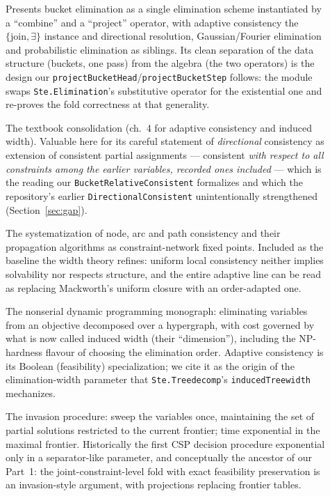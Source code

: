 \documentclass[11pt]{article}
\newcommand{\ste}[1]{\texttt{#1}}
\begin{document}
\begin{description}
\item[\citet{dechter1999bucket}] Presents bucket elimination as a
single elimination scheme instantiated by a ``combine'' and a
``project'' operator, with adaptive consistency the
$\{\text{join},\exists\}$ instance and directional resolution,
Gaussian/Fourier elimination and probabilistic elimination as
siblings. Its clean separation of the data structure (buckets, one
pass) from the algebra (the two operators) is the design our
\ste{projectBucketHead}/\ste{projectBucketStep} follows: the module
swaps \ste{Ste.Elimination}'s substitutive operator for the
existential one and re-proves the fold correctness at that generality.

\item[\citet{dechter2003constraint}] The textbook consolidation
(ch.~4 for adaptive consistency and induced width). Valuable here for
its careful statement of \emph{directional} consistency as extension
of consistent partial assignments --- consistent \emph{with respect to
all constraints among the earlier variables, recorded ones included}
--- which is the reading our \ste{BucketRelativeConsistent} formalizes
and which the repository's earlier \ste{DirectionalConsistent}
unintentionally strengthened (Section~\ref{sec:gap}).

\item[\citet{mackworth1977consistency}] The systematization of node,
arc and path consistency and their propagation algorithms as
constraint-network fixed points. Included as the baseline the width
theory refines: uniform local consistency neither implies solvability
nor respects structure, and the entire adaptive line can be read as
replacing Mackworth's uniform closure with an order-adapted one.

\item[\citet{bertele1972nonserial}] The nonserial dynamic programming
monograph: eliminating variables from an objective decomposed over a
hypergraph, with cost governed by what is now called induced width
(their ``dimension''), including the NP-hardness flavour of choosing
the elimination order. Adaptive consistency is its Boolean
(feasibility) specialization; we cite it as the origin of the
elimination-width parameter that \ste{Ste.Treedecomp}'s
\ste{inducedTreewidth} mechanizes.

\item[\citet{seidel1981invasion}] The invasion procedure: sweep the
variables once, maintaining the set of partial solutions restricted to
the current frontier; time exponential in the maximal frontier.
Historically the first CSP decision procedure exponential only in a
separator-like parameter, and conceptually the ancestor of our
Part~1: the joint-constraint-level fold with exact feasibility
preservation is an invasion-style argument, with projections replacing
frontier tables.


\end{description}
\end{document}
